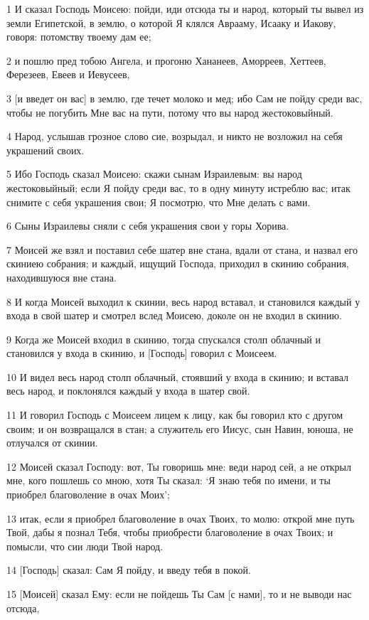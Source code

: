 \par 1 И сказал Господь Моисею: пойди, иди отсюда ты и народ, который ты вывел из земли Египетской, в землю, о которой Я клялся Аврааму, Исааку и Иакову, говоря: потомству твоему дам ее;
\par 2 и пошлю пред тобою Ангела, и прогоню Хананеев, Аморреев, Хеттеев, Ферезеев, Евеев и Иевусеев,
\par 3 [и введет он вас] в землю, где течет молоко и мед; ибо Сам не пойду среди вас, чтобы не погубить Мне вас на пути, потому что вы народ жестоковыйный.
\par 4 Народ, услышав грозное слово сие, возрыдал, и никто не возложил на себя украшений своих.
\par 5 Ибо Господь сказал Моисею: скажи сынам Израилевым: вы народ жестоковыйный; если Я пойду среди вас, то в одну минуту истреблю вас; итак снимите с себя украшения свои; Я посмотрю, что Мне делать с вами.
\par 6 Сыны Израилевы сняли с себя украшения свои у горы Хорива.
\par 7 Моисей же взял и поставил себе шатер вне стана, вдали от стана, и назвал его скиниею собрания; и каждый, ищущий Господа, приходил в скинию собрания, находившуюся вне стана.
\par 8 И когда Моисей выходил к скинии, весь народ вставал, и становился каждый у входа в свой шатер и смотрел вслед Моисею, доколе он не входил в скинию.
\par 9 Когда же Моисей входил в скинию, тогда спускался столп облачный и становился у входа в скинию, и [Господь] говорил с Моисеем.
\par 10 И видел весь народ столп облачный, стоявший у входа в скинию; и вставал весь народ, и поклонялся каждый у входа в шатер свой.
\par 11 И говорил Господь с Моисеем лицем к лицу, как бы говорил кто с другом своим; и он возвращался в стан; а служитель его Иисус, сын Навин, юноша, не отлучался от скинии.
\par 12 Моисей сказал Господу: вот, Ты говоришь мне: веди народ сей, а не открыл мне, кого пошлешь со мною, хотя Ты сказал: `Я знаю тебя по имени, и ты приобрел благоволение в очах Моих';
\par 13 итак, если я приобрел благоволение в очах Твоих, то молю: открой мне путь Твой, дабы я познал Тебя, чтобы приобрести благоволение в очах Твоих; и помысли, что сии люди Твой народ.
\par 14 [Господь] сказал: Сам Я пойду, и введу тебя в покой.
\par 15 [Моисей] сказал Ему: если не пойдешь Ты Сам [с нами], то и не выводи нас отсюда,
